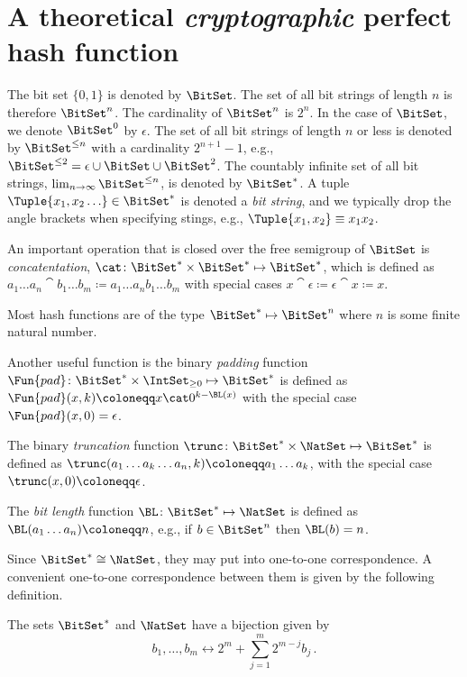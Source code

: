 \documentclass[ ../main.tex]{subfiles}
\begin{document}
\section{A theoretical \emph{cryptographic} perfect hash function}
The bit set $\{0,1\}$ is denoted by $\BitSet$.
The set of all bit strings of length $n$ is therefore $\BitSet^n$.
The cardinality of $\BitSet^n$ is $2^n$.
In the case of $\BitSet$, we denote $\BitSet^0$ by $\epsilon$.
The set of all bit strings of length $n$ or less is denoted by $\BitSet^{\leq n}$ with a cardinality $2^{n+1}-1$, e.g., $\BitSet^{\leq 2} = \epsilon \cup \BitSet \cup \BitSet^2$.
The countably infinite set of all bit strings, $\lim_{n \to \infty} \BitSet^{\leq n}$, is denoted by $\BitSet^{*}$.
A tuple $\Tuple{x_1,x_2\ldots} \in \BitSet^{*}$ is denoted a \emph{bit string}, and we typically drop the angle brackets when specifying stings, e.g., $\Tuple{x_1,x_2} \equiv x_1 x_2$.

An important operation that is closed over the free semigroup of $\BitSet$ is \emph{concatentation}, $\cat \colon \BitSet^* \times \BitSet^* \mapsto \BitSet^*$, which is defined as $a_1 \ldots a_n \cat b_1 \ldots b_m \coloneqq a_1 \ldots a_n b_1 \ldots b_m$ with special cases $x \cat \epsilon \coloneqq \epsilon \cat x \coloneqq x$.

Most hash functions are of the type $\BitSet^* \mapsto \BitSet^n$ where $n$ is some finite natural number.

Another useful function is the binary \emph{padding} function
$\Fun{pad} \colon \BitSet^* \times \IntSet_{\geq 0} \mapsto \BitSet^*$ is defined as $\Fun{pad}(x,k) \coloneqq x \cat 0^{k-\BL(x)}$ with the special case $\Fun{pad}(x,0) = \epsilon$.


The binary \emph{truncation} function $\trunc \colon \BitSet^* \times \NatSet \mapsto \BitSet^*$ is defined as $\trunc(a_1 \ldots a_k \ldots a_n, k) \coloneqq a_1 \ldots a_k$, with the special case $\trunc(x,0) \coloneqq \epsilon$.

The \emph{bit length} function $\BL \colon \BitSet^* \mapsto \NatSet$ is defined as $\BL(a_1 \ldots a_n) \coloneqq n$, e.g., if $b \in \BitSet^{n}$ then $\BL(b) = n$.

Since $\BitSet^* \cong \NatSet$, they may put into one-to-one correspondence.
A convenient one-to-one correspondence between them is given by the following definition.
\begin{definition}
	\label{def:mapping}
	The sets $\BitSet^*$ and $\NatSet$ have a bijection given by
	\begin{equation}
	b_1,\ldots,b_m \longleftrightarrow 2^m + \sum_{j=1}^{m} 2^{m - j} b_j\,.
	\end{equation}
\end{definition}
\end{document}
